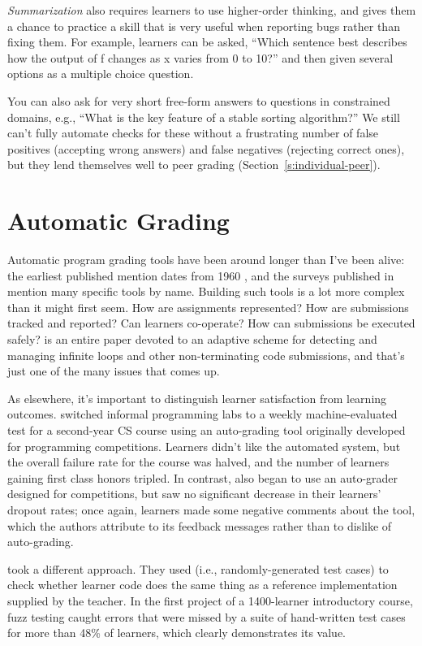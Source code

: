 \emph{Summarization} also requires learners to use higher-order thinking, and
gives them a chance to practice a skill that is very useful when
reporting bugs rather than fixing them. For example, learners can be
asked, ``Which sentence best describes how the output of f changes as x
varies from 0 to 10?'' and then given several options as a multiple
choice question.

You can also ask for very short free-form answers to questions in
constrained domains, e.g., ``What is the key feature of a stable sorting
algorithm?'' We still can't fully automate checks for these without a
frustrating number of false positives (accepting wrong answers) and
false negatives (rejecting correct ones), but they lend themselves well
to peer grading (Section~\ref{s:individual-peer}).

\section{Automatic Grading}\label{s:exercises-grading}

Automatic program grading tools have been around longer than I've been
alive: the earliest published mention dates from 1960
\cite{Holl1960}, and the surveys published in
\cite{Douc2005,Ihan2010} mention many specific tools by name.
Building such tools is a lot more complex than it might first seem. How
are assignments represented? How are submissions tracked and reported?
Can learners co-operate? How can submissions be executed safely?
\cite{Edwa2014a} is an entire paper devoted to an adaptive scheme for
detecting and managing infinite loops and other non-terminating code
submissions, and that's just one of the many issues that comes up.

As elsewhere, it's important to distinguish learner satisfaction from
learning outcomes. \cite{Magu2018} switched informal programming labs
to a weekly machine-evaluated test for a second-year CS course using an
auto-grading tool originally developed for programming competitions.
Learners didn't like the automated system, but the overall failure rate
for the course was halved, and the number of learners gaining first
class honors tripled. In contrast, \cite{Rubi2014} also began to use
an auto-grader designed for competitions, but saw no significant
decrease in their learners' dropout rates; once again, learners made
some negative comments about the tool, which the authors attribute to
its feedback messages rather than to dislike of auto-grading.

\cite{Srid2016} took a different approach. They used
 (i.e., randomly-generated
test cases) to check whether learner code does the same thing as a
reference implementation supplied by the teacher. In the first project
of a 1400-learner introductory course, fuzz testing caught errors that
were missed by a suite of hand-written test cases for more than 48\% of
learners, which clearly demonstrates its value.

